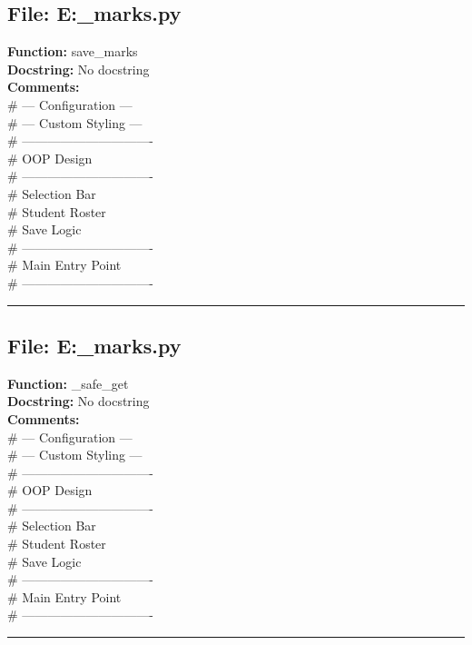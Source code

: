 {\subsection*{File: E:\project\capstone\frontend\faculty\assignment_marks.py}
\textbf{Function:} save_marks\\
\textbf{Docstring:} No docstring\\
\textbf{Comments:}\\
# --- Configuration ---\\
# --- Custom Styling ---\\
# -------------------------------\\
# OOP Design\\
# -------------------------------\\
# Selection Bar\\
# Student Roster\\
# Save Logic\\
# -------------------------------\\
# Main Entry Point\\
# -------------------------------\\

\hrule

\subsection*{File: E:\project\capstone\frontend\faculty\assignment_marks.py}
\textbf{Function:} _safe_get\\
\textbf{Docstring:} No docstring\\
\textbf{Comments:}\\
# --- Configuration ---\\
# --- Custom Styling ---\\
# -------------------------------\\
# OOP Design\\
# -------------------------------\\
# Selection Bar\\
# Student Roster\\
# Save Logic\\
# -------------------------------\\
# Main Entry Point\\
# -------------------------------\\

\hrule

}

